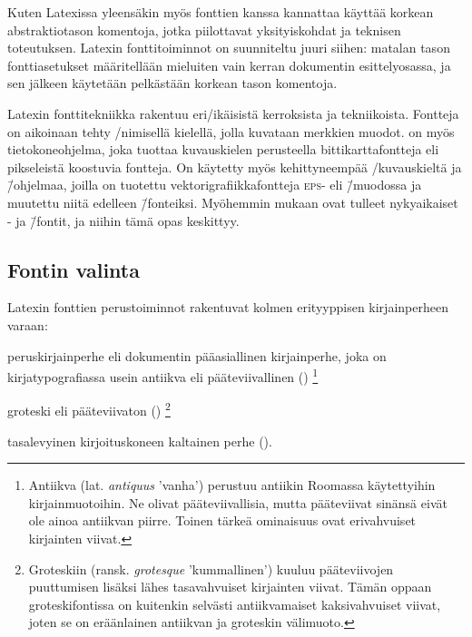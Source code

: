 Kuten Latexissa yleensäkin myös fonttien kanssa kannattaa käyttää
korkean abstraktiotason komentoja, jotka piilottavat yksityiskohdat ja
teknisen toteutuksen. Latexin fonttitoiminnot on suunniteltu juuri
siihen: matalan tason font\-ti\-ase\-tuk\-set määritellään mieluiten
vain kerran dokumentin esittelyosassa, ja sen jälkeen käytetään
pelkästään korkean tason komentoja.

Latexin fonttitekniikka rakentuu eri\-/ikäisistä kerroksista ja
tekniikoista. Fontteja on aikoinaan tehty
\-/nimisellä kielellä, jolla
kuvataan merkkien muodot.  on myös tietokoneohjelma,
joka tuottaa kuvauskielen perusteella bittikarttafontteja eli
pikseleistä koostuvia fontteja. On käytetty myös kehittyneempää
\-/kuvauskieltä ja \=/ohjelmaa,
joilla on tuotettu vek\-tori\-gra\-fiik\-ka\-font\-te\-ja \textsc{eps}-
eli  \=/muodossa ja muutettu niitä
edelleen  \=/fonteiksi. Myöhemmin mukaan
ovat tulleet nyky\-aikai\-set - ja  \=/fontit, ja niihin tämä opas keskittyy.

\subsection{Fontin valinta}
\label{luku:fontin_valinta}

Latexin fonttien perus\-toiminnot rakentuvat kolmen erityyppisen
kirjainperheen varaan:

\begin{nluetelma}

\item peruskirjainperhe eli dokumentin pääasiallinen kirjainperhe, joka
  on kirja\-typo\-gra\-fias\-sa usein antiikva eli pääteviivallinen
  ()%
  \footnote{Antiikva (lat. \emph{antiquus} 'vanha') perustuu antiikin
    Roomassa käytettyihin kirjainmuotoihin. Ne olivat pääteviivallisia,
    mutta pääteviivat sinänsä eivät ole ainoa antiikvan piirre. Toinen
    tärkeä ominaisuus ovat erivahvuiset kirjainten viivat.}

\item groteski eli pääteviivaton ()%
  \footnote{Groteskiin (ransk. \emph{grotesque} 'kummallinen') kuuluu
    pääteviivojen puuttumisen lisäksi lähes tasavahvuiset kirjainten
    viivat. Tämän oppaan groteskifontissa on kuitenkin selvästi
    antiikvamaiset kaksivahvuiset viivat, joten se on eräänlainen
    antiikvan ja groteskin välimuoto.}

\item tasalevyinen kirjoituskoneen kaltainen perhe
  ().

\end{nluetelma}

